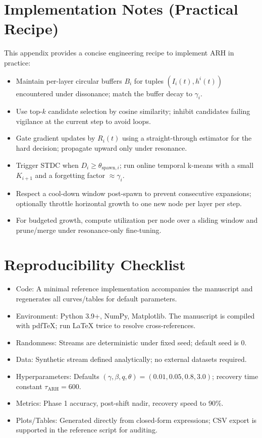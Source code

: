 \documentclass{article}
\numberwithin{figure}{section}
\numberwithin{table}{section}
\numberwithin{algorithm}{section}
\begin{document}
\begin{appendices}
\section{Implementation Notes (Practical Recipe)}
\label{app:impl}
This appendix provides a concise engineering recipe to implement ARH in practice:
\begin{itemize}
    \item Maintain per-layer circular buffers $B_i$ for tuples $(I_i(t), h^i(t))$ encountered under dissonance; match the buffer decay to $\gamma_i$.
    \item Use top-$k$ candidate selection by cosine similarity; inhibit candidates failing vigilance at the current step to avoid loops.
    \item Gate gradient updates by $R_i(t)$ using a straight-through estimator for the hard decision; propagate upward only under resonance.
    \item Trigger STDC when $D_i \ge \theta_{\text{spawn},i}$; run online temporal k-means with a small $K_{i+1}$ and a forgetting factor $\approx \gamma_i$.
    \item Respect a cool-down window post-spawn to prevent consecutive expansions; optionally throttle horizontal growth to one new node per layer per step.
    \item For budgeted growth, compute utilization per node over a sliding window and prune/merge under resonance-only fine-tuning.
\end{itemize}

\section{Reproducibility Checklist}
\label{app:reprod_checklist}
\begin{itemize}
    \item Code: A minimal reference implementation accompanies the manuscript and regenerates all curves/tables for default parameters.
    \item Environment: Python 3.9+, NumPy, Matplotlib. The manuscript is compiled with pdfTeX; run LaTeX twice to resolve cross-references.
    \item Randomness: Streams are deterministic under fixed seed; default seed is 0.
    \item Data: Synthetic stream defined analytically; no external datasets required.
    \item Hyperparameters: Defaults $(\gamma,\beta,q,\theta)=(0.01,0.05,0.8,3.0)$; recovery time constant $\tau_{\text{ARH}}=600$.
    \item Metrics: Phase 1 accuracy, post-shift nadir, recovery speed to 90\%.
    \item Plots/Tables: Generated directly from closed-form expressions; CSV export is supported in the reference script for auditing.
\end{itemize}

\end{appendices}
\end{document}
